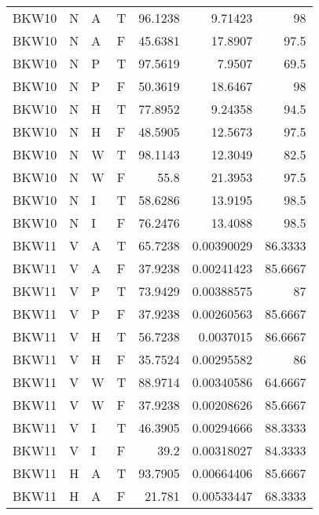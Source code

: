 \begin{longtable}{llllrrr}
    BKW10    & N     & A     & T          & 96.1238    & 9.71423     & 98       \\
    BKW10    & N     & A     & F          & 45.6381    & 17.8907     & 97.5     \\
    BKW10    & N     & P     & T          & 97.5619    & 7.9507      & 69.5     \\
    BKW10    & N     & P     & F          & 50.3619    & 18.6467     & 98       \\
    BKW10    & N     & H     & T          & 77.8952    & 9.24358     & 94.5     \\
    BKW10    & N     & H     & F          & 48.5905    & 12.5673     & 97.5     \\
    BKW10    & N     & W     & T          & 98.1143    & 12.3049     & 82.5     \\
    BKW10    & N     & W     & F          & 55.8       & 21.3953     & 97.5     \\
    BKW10    & N     & I     & T          & 58.6286    & 13.9195     & 98.5     \\
    BKW10    & N     & I     & F          & 76.2476    & 13.4088     & 98.5     \\
    BKW11    & V     & A     & T          & 65.7238    & 0.00390029  & 86.3333  \\
    BKW11    & V     & A     & F          & 37.9238    & 0.00241423  & 85.6667  \\
    BKW11    & V     & P     & T          & 73.9429    & 0.00388575  & 87       \\
    BKW11    & V     & P     & F          & 37.9238    & 0.00260563  & 85.6667  \\
    BKW11    & V     & H     & T          & 56.7238    & 0.0037015   & 86.6667  \\
    BKW11    & V     & H     & F          & 35.7524    & 0.00295582  & 86       \\
    BKW11    & V     & W     & T          & 88.9714    & 0.00340586  & 64.6667  \\
    BKW11    & V     & W     & F          & 37.9238    & 0.00208626  & 85.6667  \\
    BKW11    & V     & I     & T          & 46.3905    & 0.00294666  & 88.3333  \\
    BKW11    & V     & I     & F          & 39.2       & 0.00318027  & 84.3333  \\
    BKW11    & H     & A     & T          & 93.7905    & 0.00664406  & 85.6667  \\
    BKW11    & H     & A     & F          & 21.781     & 0.00533447  & 68.3333  \\

\end{longtable}
